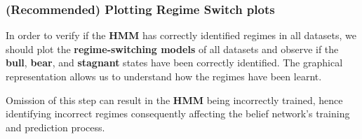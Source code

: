 \documentclass[11pt]{article}
\begin{document}
    \hypertarget{recommended-plotting-regime-switch-plots}{%
\subsubsection{(Recommended) Plotting Regime Switch
plots}\label{recommended-plotting-regime-switch-plots}}

In order to verify if the \textbf{HMM} has correctly identified regimes
in all datasets, we should plot the \textbf{regime-switching models} of
all datasets and observe if the \textbf{bull}, \textbf{bear}, and
\textbf{stagnant} states have been correctly identified. The graphical
representation allows us to understand how the regimes have been learnt.

Omission of this step can result in the \textbf{HMM} being incorrectly
trained, hence identifying incorrect regimes consequently affecting the
belief network's training and prediction process.
\end{document}
